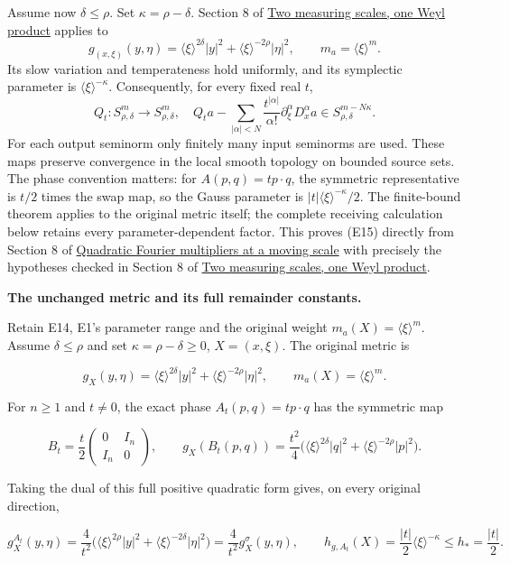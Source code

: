 \documentclass[
  11pt,
]{article}
\begin{document}
Assume now \(\delta\leq\rho\). Set \(\kappa=\rho-\delta\). Section 8 of
\href{weyl-metric-products.pdf}{Two measuring scales, one Weyl product}
applies to \[
g_{(x,\xi)}(y,\eta)=\langle\xi\rangle^{2\delta}|y|^2
+\langle\xi\rangle^{-2\rho}|\eta|^2,
\qquad m_a=\langle\xi\rangle^m.
\tag{E14}
\] Its slow variation and temperateness hold uniformly, and its
symplectic parameter is \(\langle\xi\rangle^{-\kappa}\). Consequently,
for every fixed real \(t\), \[
Q_t:S^m_{\rho,\delta}\longrightarrow S^m_{\rho,\delta},
\quad
Q_ta-\sum_{|\alpha|<N}\frac{t^{|\alpha|}}{\alpha!}
\partial_\xi^\alpha D_x^\alpha a
\in S^{m-N\kappa}_{\rho,\delta}.
\tag{E15}
\] For each output seminorm only finitely many input seminorms are used.
These maps preserve convergence in the local smooth topology on bounded
source sets. The phase convention matters: for \(A(p,q)=t p\cdot q\),
the symmetric representative is \(t/2\) times the swap map, so the Gauss
parameter is \(|t|\langle\xi\rangle^{-\kappa}/2\). The finite-bound
theorem applies to the original metric itself; the complete receiving
calculation below retains every parameter-dependent factor. This proves
(E15) directly from Section 8 of
\href{gauss-transform-estimates.pdf}{Quadratic Fourier multipliers at a
moving scale} with precisely the hypotheses checked in Section 8 of
\href{weyl-metric-products.pdf}{Two measuring scales, one Weyl product}.

\textbf{The unchanged metric and its full remainder constants.}

Retain E14, E1's parameter range and the original weight
\(m_a(X)=\langle\xi\rangle^m\). Assume \(\delta\leq\rho\) and set
\(\kappa=\rho-\delta\geq0\), \(X=(x,\xi)\). The original metric is

\[
 g_X(y,\eta)=\langle\xi\rangle^{2\delta}|y|^2+
            \langle\xi\rangle^{-2\rho}|\eta|^2,\qquad
 m_a(X)=\langle\xi\rangle^m.
 \tag{EC5}
\]

For \(n\geq1\) and \(t\ne0\), the exact phase \(A_t(p,q)=tp\cdot q\) has
the symmetric map

\[
 B_t=\frac t2\begin{pmatrix}0&I_n\\I_n&0\end{pmatrix},\qquad
 g_X(B_t(p,q))=\frac{t^2}{4}
 \bigl(\langle\xi\rangle^{2\delta}|q|^2+
       \langle\xi\rangle^{-2\rho}|p|^2\bigr).
 \tag{EC6}
\]

Taking the dual of this full positive quadratic form gives, on every
original direction,

\[
 g_X^{A_t}(y,\eta)=\frac4{t^2}
 \bigl(\langle\xi\rangle^{2\rho}|y|^2+
       \langle\xi\rangle^{-2\delta}|\eta|^2\bigr)
 =\frac4{t^2}g_X^\sigma(y,\eta),\qquad
 h_{g,A_t}(X)=\frac{|t|}{2}\langle\xi\rangle^{-\kappa}
 \leq h_*=\frac{|t|}{2}.
 \tag{EC7}
\]
\end{document}
